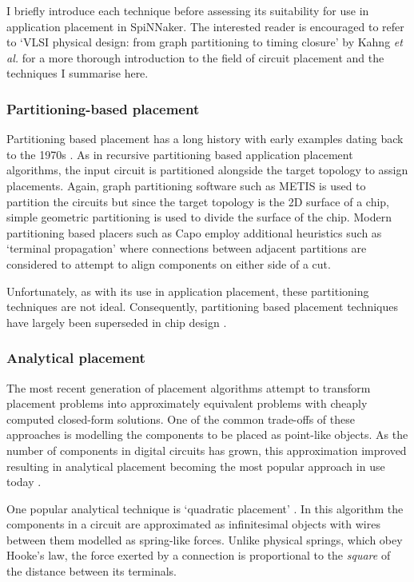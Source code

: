 			I briefly introduce each technique before assessing its suitability for
			use in application placement in SpiNNaker. The interested reader is
			encouraged to refer to `VLSI physical design: from graph partitioning to
			timing closure' by Kahng \emph{et al.} \cite{kahng11} for a more thorough
			introduction to the field of circuit placement and the techniques I
			summarise here.
			
			\subsubsection{Partitioning-based placement}
				
				Partitioning based placement has a long history with early examples
				dating back to the 1970s \cite{breuer77}. As in recursive partitioning
				based application placement algorithms, the input circuit is
				partitioned alongside the target topology to assign placements. Again,
				graph partitioning software such as METIS \cite{karypis98} is used to
				partition the circuits but since the target topology is the 2D surface
				of a chip, simple geometric partitioning is used to divide the surface
				of the chip. Modern partitioning based placers such as Capo
				\cite{roy05} employ additional heuristics such as `terminal
				propagation' where connections between adjacent partitions are
				considered to attempt to align components on either side of a cut.
				
				Unfortunately, as with its use in application placement, these
				partitioning techniques are not ideal.  Consequently, partitioning
				based placement techniques have largely been superseded in chip design
				\cite{markov15}.
			
			\subsubsection{Analytical placement}
				
				The most recent generation of placement algorithms attempt to transform
				placement problems into approximately equivalent problems with cheaply
				computed closed-form solutions. One of the common trade-offs of these
				approaches is modelling the components to be placed as point-like
				objects. As the number of components in digital circuits has grown,
				this approximation improved resulting in analytical placement becoming
				the most popular approach in use today \cite{markov15}.
				
				One popular analytical technique is `quadratic placement'
				\cite{kahng11,spindler08}. In this algorithm the components in a
				circuit are approximated as infinitesimal objects with wires between
				them modelled as spring-like forces. Unlike physical springs, which
				obey Hooke's law, the force exerted by a connection is proportional to
				the \emph{square} of the distance between its terminals.
				
